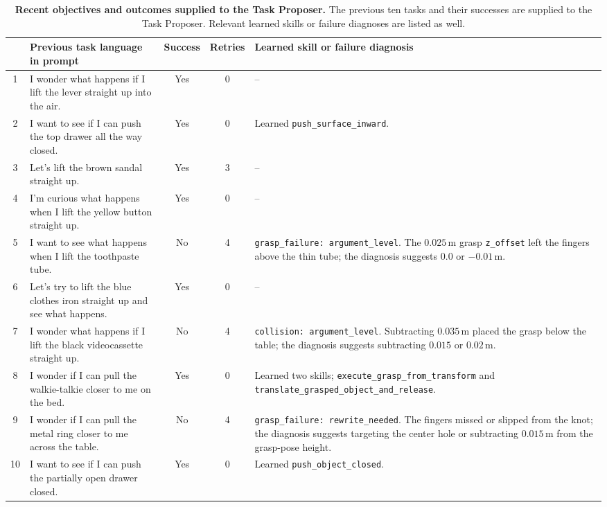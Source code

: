 \documentclass{llmxive}
\providecommand{\arraystretch}{1.05}
\begin{document}
\begin{table}[t]
\centering
\scriptsize
\setlength{\tabcolsep}{4pt}
\vspace{1.5em}
{\renewcommand{\arraystretch}{1.1}
\begin{tabular}{c p{} c c p{}}
\toprule
& \textbf{Previous task language in prompt} & \textbf{Success} &
\textbf{Retries} & \textbf{Learned skill or failure diagnosis} \\
\midrule
1 & I wonder what happens if I lift the lever straight up into the air. & Yes & 0 & -- \\
2 & I want to see if I can push the top drawer all the way closed. & Yes & 0 & Learned \texttt{push\_surface\_inward}. \\
3 & Let's lift the brown sandal straight up. & Yes & 3 & -- \\
4 & I'm curious what happens when I lift the yellow button straight up. & Yes & 0 & -- \\
5 & I want to see what happens when I lift the toothpaste tube. & No & 4 & \texttt{grasp\_failure: argument\_level}. The $0.025$\,m grasp \texttt{z\_offset} left the fingers above the thin tube; the diagnosis suggests $0.0$ or $-0.01$\,m. \\
6 & Let's try to lift the blue clothes iron straight up and see what happens. & Yes & 0 & -- \\
7 & I wonder what happens if I lift the black videocassette straight up. & No & 4 & \texttt{collision: argument\_level}. Subtracting $0.035$\,m placed the grasp below the table; the diagnosis suggests subtracting $0.015$ or $0.02$\,m. \\
8 & I wonder if I can pull the walkie-talkie closer to me on the bed. & Yes & 0 & Learned two skills; \texttt{execute\_grasp\_from\_transform} and \texttt{translate\_grasped\_object\_and\_release}. \\
9 & I wonder if I can pull the metal ring closer to me across the table. & No & 4 & \texttt{grasp\_failure: rewrite\_needed}. The fingers missed or slipped from the knot; the diagnosis suggests targeting the center hole or subtracting $0.015$\,m from the grasp-pose height. \\
10 & I want to see if I can push the partially open drawer closed. & Yes & 0 & Learned \texttt{push\_object\_closed}. \\
\bottomrule
\end{tabular}
}
\caption{
\textbf{Recent objectives and outcomes supplied to the Task Proposer.}
The previous ten tasks and their successes are supplied to the Task Proposer. Relevant learned skills or failure diagnoses are listed as well.
}
\label{tab:proposal_history}
\end{table}
\end{document}
